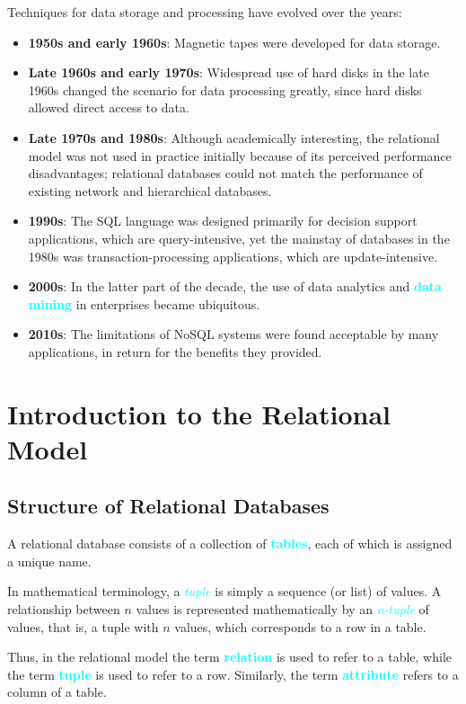 \documentclass[a4paper,12pt,twoside,openany]{book}
\newcommand{\textcy}[1]{\textbf{\textcolor{cyan}{#1}}}
\newcommand{\textcyi}[1]{\textit{\textcolor{cyan}{#1}}}
\begin{document}
Techniques for data storage and processing have evolved over the years:
\begin{itemize}
    \item\textbf{1950s and early 1960s}: Magnetic tapes were developed for data storage.
    \item\textbf{Late 1960s and early 1970s}: Widespread use of hard disks in the late 1960s changed the scenario for data processing greatly, since hard disks allowed direct access to data.
    \item\textbf{Late 1970s and 1980s}: Although academically interesting, the relational model was not used in practice initially because of its perceived performance disadvantages; relational databases could not match the performance of existing network and hierarchical databases.
    \item\textbf{1990s}: The SQL language was designed primarily for decision support applications, which are query-intensive, yet the mainstay of databases in the 1980s was transaction-processing applications, which are update-intensive.
    \item\textbf{2000s}: In the latter part of the decade, the use of data analytics and \textcy{data mining} in enterprises became ubiquitous.
    \item\textbf{2010s}: The limitations of NoSQL systems were found acceptable by many applications, in return for the benefits they provided.
\end{itemize}

\chapter{Introduction to the Relational Model}
\section{Structure of Relational Databases}

A relational database consists of a collection of \textcy{tables}, each of which is assigned a unique name.

In mathematical terminology, a \textcyi{tuple} is simply a sequence (or list) of values. A relationship between $n$ values is represented mathematically by an \textcyi{n-tuple} of values, that is, a tuple with $n$ values, which corresponds to a row in a table.

Thus, in the relational model the term \textcy{relation} is used to refer to a table, while the term \textcy{tuple} is used to refer to a row. Similarly, the term \textcy{attribute} refers to a column of a table.
\end{document}
